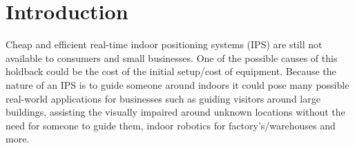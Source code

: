 \section{Introduction }\label{sec:intro}
Cheap and efficient real-time indoor positioning systems (IPS) are still not available to consumers and small businesses. One of the possible causes of this holdback could be the cost of the initial setup/cost of equipment. Because the nature of an IPS is to guide someone around indoors it could pose many possible real-world applications for businesses such as guiding visitors around large buildings, assisting the visually impaired around unknown locations without the need for someone to guide them, indoor robotics for factory’s/warehouses and more.